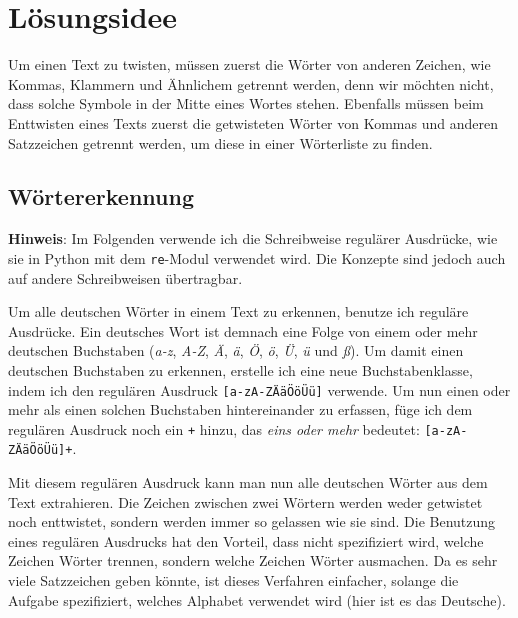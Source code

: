 \documentclass[a4paper,10pt,ngerman]{scrartcl}
\title{\Aufgabe}
\author{\Name\\Team-ID: \TeamId}
\date{\today}
\begin{document}
\maketitle
\tableofcontents

\clearpage

\section{Lösungsidee}
Um einen Text zu twisten, müssen zuerst die Wörter von anderen Zeichen, wie Kommas, Klammern und Ähnlichem getrennt werden, denn wir möchten nicht, dass solche Symbole in der Mitte eines Wortes stehen. Ebenfalls müssen beim Enttwisten eines Texts zuerst die getwisteten Wörter von Kommas und anderen Satzzeichen getrennt werden, um diese in einer Wörterliste zu finden.

\subsection{Wörtererkennung}
\label{woertererkennung}
\textbf{Hinweis}: Im Folgenden verwende ich die Schreibweise regulärer Ausdrücke, wie sie in Python mit dem \texttt{re}-Modul verwendet wird. Die Konzepte sind jedoch auch auf andere Schreibweisen übertragbar.
\vspace{10pt}

Um alle deutschen Wörter in einem Text zu erkennen, benutze ich reguläre Ausdrücke. Ein deutsches Wort ist demnach eine Folge von einem oder mehr deutschen Buchstaben (\textit{a-z}, \textit{A-Z}, \textit{Ä}, \textit{ä}, \textit{Ö}, \textit{ö}, \textit{Ü}, \textit{ü} und \textit{ß}). Um damit einen deutschen Buchstaben zu erkennen, erstelle ich eine neue Buchstabenklasse, indem ich den regulären Ausdruck \texttt{[a-zA-ZÄäÖöÜü]} verwende. Um nun einen oder mehr als einen solchen Buchstaben hintereinander zu erfassen, füge ich dem regulären Ausdruck noch ein \texttt{+} hinzu, das \textit{eins oder mehr} bedeutet: \texttt{[a-zA-ZÄäÖöÜü]+}.

Mit diesem regulären Ausdruck kann man nun alle deutschen Wörter aus dem Text extrahieren. Die Zeichen zwischen zwei Wörtern werden weder getwistet noch enttwistet, sondern werden immer so gelassen wie sie sind. Die Benutzung eines regulären Ausdrucks hat den Vorteil, dass nicht spezifiziert wird, welche Zeichen Wörter trennen, sondern welche Zeichen Wörter ausmachen. Da es sehr viele Satzzeichen geben könnte, ist dieses Verfahren einfacher, solange die Aufgabe spezifiziert, welches Alphabet verwendet wird (hier ist es das Deutsche).
\end{document}

